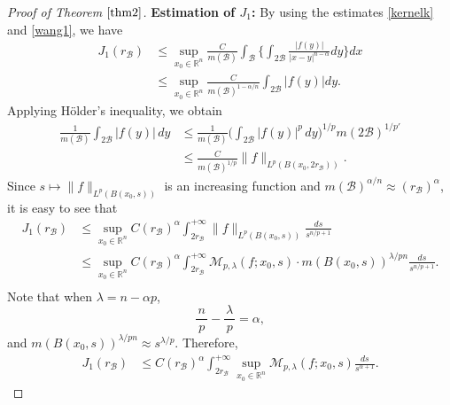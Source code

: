 \documentclass[10pt, reqno]{amsart}
\theoremstyle{definition}
\theoremstyle{remark}
\numberwithin{equation}{section}
\begin{document}
\begin{proof}[Proof of Theorem $\ref{thm2}$]
\textbf{Estimation of $J_1$:} By using the estimates \eqref{kernelk} and \eqref{wang1}, we have
\begin{equation*}
\begin{split}
J_1(r_{\mathcal{B}})&\leq\sup_{x_0\in\mathbb R^n}\frac{C}{m(\mathcal{B})}\int_{\mathcal{B}}\bigg\{\int_{2\mathcal{B}}\frac{|f(y)|}{|x-y|^{n-\alpha}}dy\bigg\}dx\\
&\leq\sup_{x_0\in\mathbb R^n}\frac{C}{m(\mathcal{B})^{1-\alpha/n}}
\int_{2\mathcal{B}}|f(y)|dy.
\end{split}
\end{equation*}
Applying H\"older's inequality, we obtain
\begin{equation*}
\begin{split}
\frac{1}{m(\mathcal{B})}\int_{2\mathcal{B}}|f(y)|\,dy
&\leq\frac{1}{m(\mathcal{B})}\bigg(\int_{2\mathcal{B}}|f(y)|^p\,dy\bigg)^{1/p}m(2\mathcal{B})^{1/{p'}}\\
&\leq\frac{C}{m(\mathcal{B})^{1/p}}\big\|f\big\|_{L^p(B(x_0,2r_{\mathcal{B}}))}.
\end{split}
\end{equation*}
Since $s\mapsto\|f\|_{L^p(B(x_0,s))}$ is an increasing function and $m(\mathcal{B})^{\alpha/n}\approx(r_{\mathcal{B}})^{\alpha}$, it is easy to see that
\begin{equation*}
\begin{split}
J_1(r_{\mathcal{B}})
&\leq \sup_{x_0\in\mathbb R^n}C(r_{\mathcal{B}})^{\alpha}\int_{2r_{\mathcal{B}}}^{+\infty}\big\|f\big\|_{L^p(B(x_0,s))}\frac{ds}{s^{n/p+1}}\\
&\leq \sup_{x_0\in\mathbb R^n}C(r_{\mathcal{B}})^{\alpha}\int_{2r_{\mathcal{B}}}^{+\infty}\mathcal{M}_{p,\lambda}(f;x_0,s)\cdot m(B(x_0,s))^{\lambda/{pn}}\frac{ds}{s^{n/p+1}}.\\
\end{split}
\end{equation*}
Note that when $\lambda=n-\alpha p$,
\begin{equation}\label{wang5}
\frac{\,n\,}{p}-\frac{\lambda}{\,p\,}=\alpha,
\end{equation}
and $m(B(x_0,s))^{\lambda/{pn}}\approx s^{\lambda/p}$. Therefore,
\begin{equation*}
\begin{split}
J_1(r_{\mathcal{B}})
&\leq C(r_{\mathcal{B}})^{\alpha}\int_{2r_{\mathcal{B}}}^{+\infty}
\sup_{x_0\in\mathbb R^n}\mathcal{M}_{p,\lambda}(f;x_0,s)\frac{ds}{s^{\alpha+1}}.
\end{split}
\end{equation*}

\end{proof}
\end{document}
